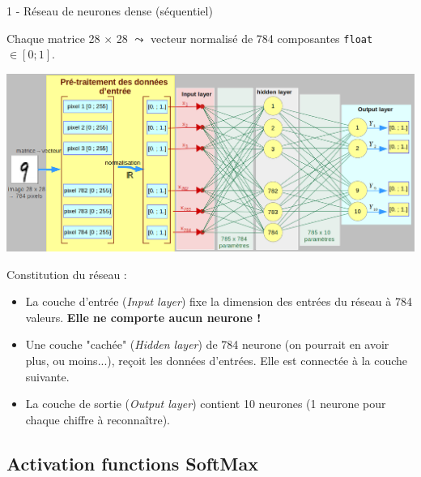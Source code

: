 \documentclass[10pt,serif,mathserif,compress,hyperref={colorlinks}]{beamer}
\begin{document}
\begin{frame}{1 - Réseau de neurones dense (séquentiel)}

  {\footnotesize Chaque matrice 28$\,\times\,$28 $\leadsto$ vecteur normalisé de 784 composantes \texttt{float} $\in [0;1]$.}

  \hspace*{-5mm}\includegraphics[width=.9\textwidth]{images/archiReseau-2.png}
  
  {\footnotesize
    Constitution du réseau :
  \begin{itemize}
  \item La couche d'entrée ({\em Input layer}) fixe la dimension des entrées du réseau à 784 valeurs. {\bf Elle ne comporte aucun neurone !}
  \item Une couche "cachée" ({\em Hidden layer}) de 784 neurone (on pourrait en avoir plus, ou moins...), reçoit les données d'entrées. Elle est connectée à la couche suivante.
  \item La couche de sortie ({\em Output layer}) contient 10 neurones (1 neurone pour chaque chiffre à reconnaître).
  \end{itemize}
  }

\end{frame}

\subsection{Activation functions SoftMax}
\end{document}
